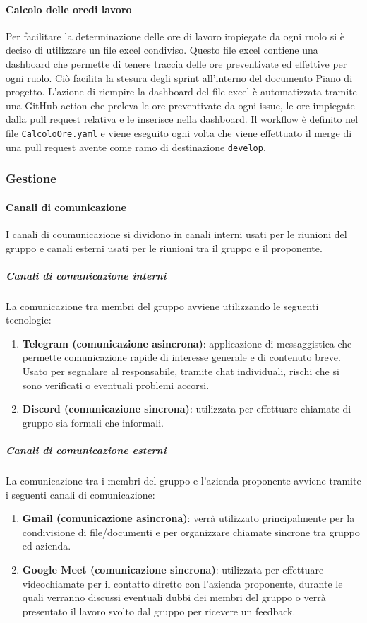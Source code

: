 \paragraph{Calcolo delle oredi lavoro}
\label{par:calcolo_ore_lavoro}
Per facilitare la determinazione delle ore di lavoro impiegate da ogni ruolo si è deciso di utilizzare un file excel condiviso.
Questo file excel contiene una dashboard che permette di tenere traccia delle ore preventivate ed effettive per ogni ruolo.
Ciò facilita la stesura degli sprint all'interno del documento Piano di progetto.
L'azione di riempire la dashboard del file excel è automatizzata tramite una GitHub action che preleva le ore preventivate da ogni issue, le ore impiegate dalla pull request relativa e le inserisce nella dashboard.
Il workflow è definito nel file \texttt{CalcoloOre.yaml} e viene eseguito ogni volta che viene effettuato il merge di una pull request avente come ramo di destinazione \texttt{develop}.

\subsubsection{Gestione}
\paragraph{Canali di comunicazione}
I canali di coumunicazione si dividono in canali interni usati per le riunioni del gruppo e canali esterni usati per le riunioni tra il gruppo e il proponente.

\subparagraph{Canali di comunicazione interni}
\label{subpar:canali_interni}
La comunicazione tra membri del gruppo avviene utilizzando le seguenti tecnologie:
\begin{enumerate}
    \item \textbf{Telegram (comunicazione asincrona)}: applicazione di messaggistica che permette comunicazione rapide di interesse generale e di contenuto breve.
    Usato per segnalare al responsabile, tramite chat individuali, rischi che si sono verificati o eventuali problemi accorsi.

    \item \textbf{Discord (comunicazione sincrona)}: utilizzata per effettuare chiamate di gruppo sia formali che informali.
\end{enumerate}

\subparagraph{Canali di comunicazione esterni}
La comunicazione tra i membri del gruppo e l'azienda proponente avviene tramite i seguenti canali di comunicazione:
\begin{enumerate}
    \item \textbf{Gmail (comunicazione asincrona)}: verrà utilizzato principalmente per la condivisione di file/documenti e per organizzare chiamate sincrone tra gruppo ed azienda.

    \item \textbf{Google Meet (comunicazione sincrona)}: utilizzata per effettuare videochiamate per il contatto diretto con l'azienda proponente, durante le quali verranno discussi eventuali dubbi dei membri del gruppo o verrà presentato il lavoro svolto dal gruppo per ricevere un feedback.
\end{enumerate}

